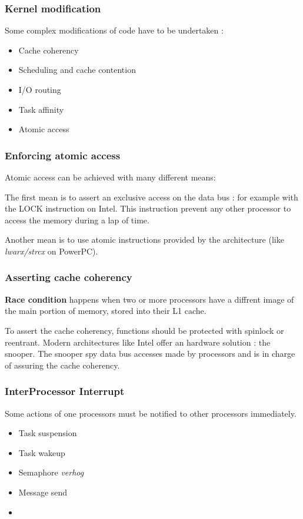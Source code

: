 
\begin{frame}
\frametitle{Kernel modification}

Some complex modifications of code have to be undertaken :

\begin{itemize}
\item
Cache coherency
\item
Scheduling and cache contention
\item
I/O routing
\item
Task affinity
\item
Atomic access
\end{itemize}

\end{frame}


\begin{frame}
\frametitle{Enforcing atomic access}

Atomic access can be achieved with many different means:

\-

The first mean is to assert an exclusive access on the data bus : for example with the LOCK instruction on Intel. This instruction prevent any other processor to access the memory during a lap of time.

\-

Another mean is to use atomic instructions provided by the architecture (like \textit{lwarx/strcx} on PowerPC).

\end{frame}


\begin{frame}
\frametitle{Asserting cache coherency}

\textbf{Race condition} happens when two or more processors have a diffrent image of the main portion of memory, stored into their L1 cache.

\-

To assert the cache coherency, functions should be protected with spinlock or reentrant. Modern architectures like Intel offer an hardware solution : the snooper. The snooper spy data bus accesses made by processors and is in charge of assuring the cache coherency.

\end{frame}


\begin{frame}
\frametitle{InterProcessor Interrupt}

Some actions of one processors must be notified to other processors immediately.

\begin{itemize}
\item
Task suspension
\item
Task wakeup
\item
Semaphore \textit{verhog}
\item
Message send
\item
\etc{}
\end{itemize}

\end{frame}


